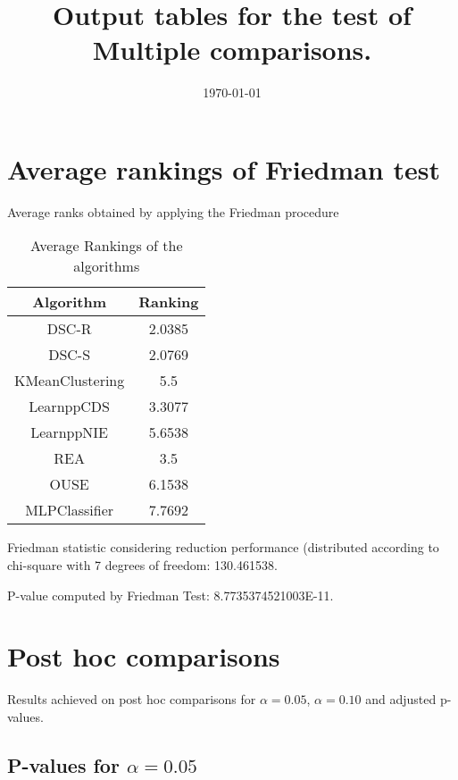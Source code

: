 \documentclass[a4paper,10pt]{article}
\title{Output tables for the test of Multiple comparisons.}
\author{}
\date{\today}
\begin{document}
\begin{landscape}
\pagestyle{empty}
\maketitle
\thispagestyle{empty}
\section{Average rankings of Friedman test}



Average ranks obtained by applying the Friedman procedure

\begin{table}[!htp]
\centering
\begin{tabular}{|c|c|}\hline
Algorithm&Ranking\\\hline
DSC-R & 2.0385\\
DSC-S & 2.0769\\
KMeanClustering & 5.5\\
LearnppCDS & 3.3077\\
LearnppNIE & 5.6538\\
REA & 3.5\\
OUSE & 6.1538\\
MLPClassifier & 7.7692\\
\hline
\end{tabular}
\caption{Average Rankings of the algorithms}
\end{table}

Friedman statistic considering reduction performance (distributed according to chi-square with 7 degrees of freedom: 130.461538.

P-value computed by Friedman Test: 8.7735374521003E-11.\newline



\pagebreak

\section{Post hoc comparisons}

Results achieved on post hoc comparisons for $\alpha = 0.05$, $\alpha = 0.10$ and adjusted p-values.

\subsection{P-values for $\alpha=0.05$}


\end{landscape}
\end{document}
